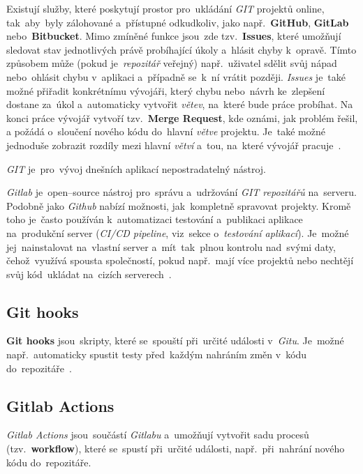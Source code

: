 \documentclass[11pt,a4paper]{report}
\begin{document}
            Existují služby, které poskytují prostor pro~ukládání \emph{GIT} projektů online, tak~aby~byly zálohované a~přístupné odkudkoliv, jako např.~\textbf{GitHub}, \textbf{GitLab} nebo~\textbf{Bitbucket}. Mimo zmíněné funkce jsou~zde tzv.~\textbf{Issues}, které umožňují sledovat stav jednotlivých právě probíhající úkoly a~hlásit chyby k~opravě. Tímto způsobem může (pokud je~\emph{repozitář} veřejný) např.~uživatel sdělit svůj nápad nebo~ohlásit chybu v~aplikaci a~případně se~k~ní vrátit později. \emph{Issues} je~také možné přiřadit konkrétnímu vývojáři, který chybu nebo~návrh ke~zlepšení dostane za~úkol a~automaticky vytvořit \emph{větev}, na~které bude práce probíhat. Na konci práce vývojář vytvoří tzv.~\textbf{Merge Request}, kde oznámi, jak problém řešil, a požádá o~sloučení nového kódu do~hlavní \emph{větve} projektu. Je~také možné jednoduše zobrazit rozdíly mezi hlavní \emph{větví} a~tou, na~které vývojář pracuje~\cite{gitscmBook}.
            
            \emph{GIT} je~pro~vývoj dnešních aplikací nepostradatelný nástroj.
            
            \emph{Gitlab} je~open--source nástroj pro~správu a~udržování \emph{GIT repozitářů} na~serveru. Podobně jako \emph{Github} nabízí možnosti, jak~kompletně spravovat projekty. Kromě toho je~často používán k~automatizaci testování a~publikaci aplikace na~produkční server (\emph{CI/CD pipeline}, viz~sekce o~\emph{testování aplikací}). Je~možné jej~nainstalovat na~vlastní server a~mít~tak~plnou kontrolu nad~svými daty, čehož~využívá spousta společností, pokud např.~mají více projektů nebo nechtějí svůj kód~ukládat na~cizích serverech~\cite{gitlab:panek2019optimalizace, gitlab:CICD, gitlab:actions}.

            \subsection{Git hooks}
                \textbf{Git hooks} jsou~skripty, které se~spouští při~určité události v~\emph{Gitu}. Je~možné např.~automaticky spustit testy před~každým nahráním změn v~kódu do~repozitáře~\cite{gitscmBook}.

            \subsection{Gitlab Actions}
                \emph{Gitlab Actions} jsou~součástí \emph{Gitlabu} a~umožňují vytvořit sadu procesů (tzv.~\textbf{workflow}), které se~spustí při~určité události, např.~při~nahrání nového kódu do~repozitáře.
                
\end{document}
